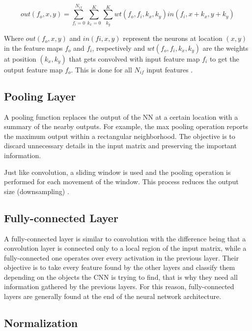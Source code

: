 \begin{equation} \label{eq:convsuda}
  out(f_o,x,y)
  =
  \sum_{f_i=0}^{N_{if}}\sum_{k_x=0}^{K}\sum_{k_y}^{K} wt(f_o,f_i,k_x,k_y)in(f_i,x+k_x,y+k_y)
\end{equation}

Where $out(f_o,x,y)$ and $in(fi,x,y)$ represent the neurons at location
$(x,y)$ in the feature maps $f_o$ and $f_i$, respectively and 
$wt(f_o,f_i,k_x,k_y)$ are
the weights at position $(k_x,k_y)$ that gets convolved with input
feature map $f_i$ to get the output feature map $f_o$. This is done 
for all $N_{if}$ input features \cite{suda}.

\subsection{Pooling Layer}

A pooling function replaces the output of the NN at a certain 
location with a summary of the nearby outputs. For example, 
the max pooling \cite{zhou1988computation} operation reports the maximum 
output within a rectangular neighborhood. The objective is to discard
unnecessary details in the input matrix and preserving the important information.

Just like convolution, a sliding window is used and the pooling
operation is performed for each movement of the window. This process
reduces the output size (downsampling) \cite{karpathy2016cs231n}.

\subsection{Fully-connected Layer}

A fully-connected layer is similar to convolution with the difference being
that a convolution layer is connected only to a local region of the input matrix, 
while a fully-connected one operates over every activation in the previous layer.
Their objective is to take every feature found by the other layers and classify
them depending on the objects the CNN is trying to find, that is why they need
all information gathered by the previous layers. For this reason, fully-connected
layers are generally found at the end of the neural network architecture.

\subsection{Normalization}\label{theorylrn}


